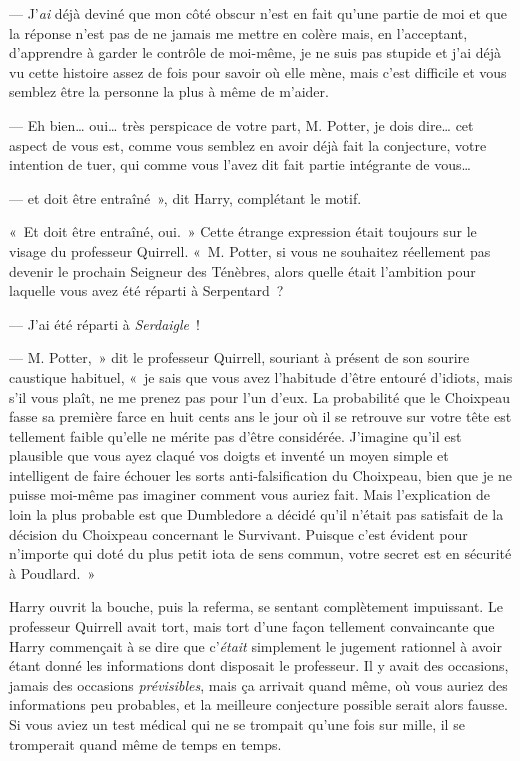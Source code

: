 --- J'\emph{ai} déjà deviné que mon côté obscur n'est en fait qu'une partie de moi et que la réponse n'est pas de ne jamais me mettre en colère mais, en l'acceptant, d'apprendre à garder le contrôle de moi-même, je ne suis pas stupide et j'ai déjà vu cette histoire assez de fois pour savoir où elle mène, mais c'est difficile et vous semblez être la personne la plus à même de m'aider.

--- Eh bien… oui… très perspicace de votre part, M. Potter, je dois dire… cet aspect de vous est, comme vous semblez en avoir déjà fait la conjecture, votre intention de tuer, qui comme vous l'avez dit fait partie intégrante de vous…

--- et doit être entraîné~», dit Harry, complétant le motif.

«~Et doit être entraîné, oui.~»
Cette étrange expression était toujours sur le visage du professeur Quirrell.
«~M. Potter, si vous ne souhaitez réellement pas devenir le prochain Seigneur des Ténèbres, alors quelle était l'ambition pour laquelle vous avez été réparti à Serpentard~?

--- J'ai été réparti à \emph{Serdaigle}~!

--- M. Potter,~» dit le professeur Quirrell, souriant à présent de son sourire caustique habituel, «~je sais que vous avez l'habitude d'être entouré d'idiots, mais s'il vous plaît, ne me prenez pas pour l'un d'eux.
La probabilité que le Choixpeau fasse sa première farce en huit cents ans le jour où il se retrouve sur votre tête est tellement faible qu'elle ne mérite pas d'être considérée.
J'imagine qu'il est plausible que vous ayez claqué vos doigts et inventé un moyen simple et intelligent de faire échouer les sorts anti-falsification du Choixpeau, bien que je ne puisse moi-même pas imaginer comment vous auriez fait.
Mais l'explication de loin la plus probable est que Dumbledore a décidé qu'il n'était pas satisfait de la décision du Choixpeau concernant le Survivant.
Puisque c'est évident pour n'importe qui doté du plus petit iota de sens commun, votre secret est en sécurité à Poudlard.~»

Harry ouvrit la bouche, puis la referma, se sentant complètement impuissant.
Le professeur Quirrell avait tort, mais tort d'une façon tellement convaincante que Harry commençait à se dire que c'\emph{était} simplement le jugement rationnel à avoir étant donné les informations dont disposait le professeur.
Il y avait des occasions, jamais des occasions \emph{prévisibles}, mais ça arrivait quand même, où vous auriez des informations peu probables, et la meilleure conjecture possible serait alors fausse.
Si vous aviez un test médical qui ne se trompait qu'une fois sur mille, il se tromperait quand même de temps en temps.

